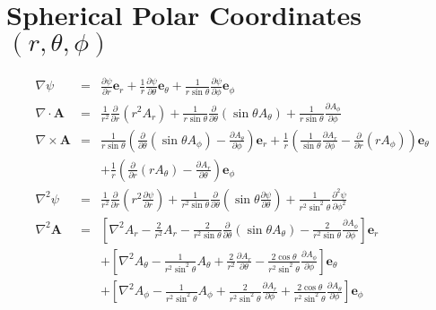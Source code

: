 \section{Spherical Polar Coordinates $(r, \theta, \phi)$}
\begin{eqnarray}
    \nabla \psi &=& \frac{\partial \psi}{\partial r} \mathbf{e}_r + \frac{1}{r} \frac{\partial \psi}{\partial \theta} \mathbf{e}_\theta + \frac{1}{r \sin \theta} \frac{\partial \psi}{\partial \phi} \mathbf{e}_\phi \\
    \nabla \cdot \mathbf{A} &=& \frac{1}{r^2} \frac{\partial}{\partial r}\left(r^2 A_r\right) + \frac{1}{r \sin \theta} \frac{\partial}{\partial \theta}\left(\sin \theta A_\theta\right) + \frac{1}{r \sin \theta} \frac{\partial A_\phi}{\partial \phi} \\
    \nabla \times \mathbf{A} &=& \frac{1}{r \sin \theta} \left( \frac{\partial}{\partial \theta} \left(\sin \theta A_\phi\right) - \frac{\partial A_\theta}{\partial \phi} \right) \mathbf{e}_r + \frac{1}{r} \left( \frac{1}{\sin \theta} \frac{\partial A_r}{\partial \phi} - \frac{\partial}{\partial r}\left(r A_\phi\right) \right) \mathbf{e}_\theta \nonumber \\
    && + \frac{1}{r} \left( \frac{\partial}{\partial r}\left(r A_\theta\right) - \frac{\partial A_r}{\partial \theta} \right) \mathbf{e}_\phi \\
    \nabla^2 \psi &=& \frac{1}{r^2} \frac{\partial}{\partial r}\left(r^2 \frac{\partial \psi}{\partial r}\right) + \frac{1}{r^2 \sin \theta} \frac{\partial}{\partial \theta}\left(\sin \theta \frac{\partial \psi}{\partial \theta}\right) + \frac{1}{r^2 \sin^2 \theta} \frac{\partial^2 \psi}{\partial \phi^2} \\
    \nabla^2 \mathbf{A} &=& \left[\nabla^2 A_r - \frac{2}{r^2} A_r - \frac{2}{r^2 \sin \theta} \frac{\partial}{\partial \theta}\left(\sin \theta A_\theta\right) - \frac{2}{r^2 \sin \theta} \frac{\partial A_\phi}{\partial \phi}\right] \mathbf{e}_r \nonumber \\
    && + \left[\nabla^2 A_\theta - \frac{1}{r^2 \sin^2 \theta} A_\theta + \frac{2}{r^2} \frac{\partial A_r}{\partial \theta} - \frac{2 \cos \theta}{r^2 \sin^2 \theta} \frac{\partial A_\phi}{\partial \phi}\right] \mathbf{e}_\theta \nonumber \\
    && + \left[\nabla^2 A_\phi - \frac{1}{r^2 \sin^2 \theta} A_\phi + \frac{2}{r^2 \sin^2 \theta} \frac{\partial A_r}{\partial \phi} + \frac{2 \cos \theta}{r^2 \sin^2 \theta} \frac{\partial A_\theta}{\partial \phi}\right] \mathbf{e}_\phi
\end{eqnarray}
    
